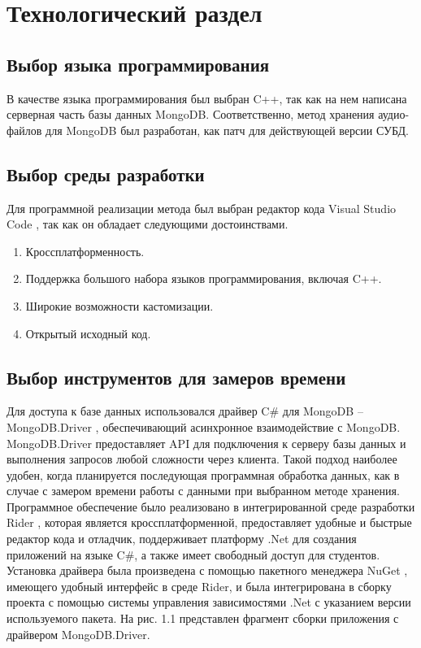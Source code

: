 \chapter{Технологический раздел}

\section{Выбор языка программирования}

В качестве языка программирования был выбран C++, так как на нем написана серверная часть базы данных MongoDB. Соответственно, метод хранения аудио-файлов для MongoDB был разработан, как патч для действующей версии СУБД.

\section{Выбор среды разработки}

Для программной реализации метода был выбран редактор кода Visual Studio Code \cite{VSC}, так как он обладает следующими достоинствами.
\begin{enumerate}
\item Кроссплатформенность.
\item Поддержка большого набора языков программирования, включая C++.
\item Широкие возможности кастомизации.
\item Открытый исходный код.
\end{enumerate}

\section{Выбор инструментов для замеров времени}

Для доступа к базе данных использовался драйвер C\# для MongoDB -- MongoDB.Driver \cite{CSDriver}, обеспечивающий асинхронное взаимодействие с MongoDB. MongoDB.Driver предоставляет API для подключения к серверу базы данных и выполнения запросов любой сложности через клиента. Такой подход наиболее удобен, когда планируется последующая программная обработка данных, как в случае с замером времени работы с данными при выбранном методе хранения.
Программное обеспечение было реализовано в интегрированной среде разработки Rider \cite{Rider}, которая является кроссплатформенной, предоставляет удобные и быстрые редактор кода и отладчик, поддерживает платформу .Net \cite{Net} для создания приложений на языке C\#, а также имеет свободный доступ для студентов. Установка драйвера была произведена с помощью пакетного менеджера NuGet \cite{NuGet}, имеющего удобный интерфейс в среде Rider, и была интегрирована в сборку проекта с помощью системы управления зависимостями .Net с указанием версии используемого пакета. На рис. 1.1 представлен фрагмент сборки приложения с драйвером MongoDB.Driver.

